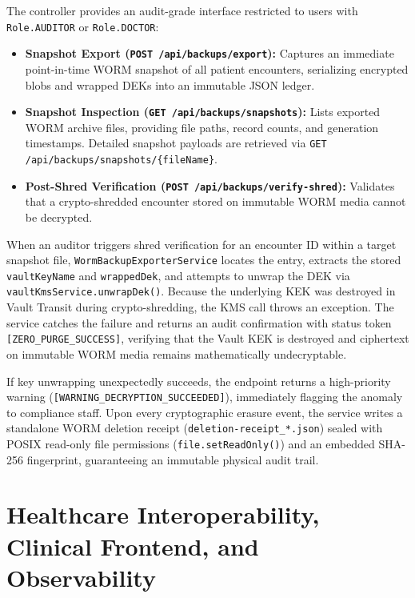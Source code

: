 The controller provides an audit-grade interface restricted to users with \texttt{Role.AUDITOR} or \texttt{Role.DOCTOR}:
\begin{itemize}
    \item \textbf{Snapshot Export (\texttt{POST /api/backups/export}):} Captures an immediate point-in-time WORM snapshot of all patient encounters, serializing encrypted blobs and wrapped DEKs into an immutable JSON ledger.
    \item \textbf{Snapshot Inspection (\texttt{GET /api/backups/snapshots}):} Lists exported WORM archive files, providing file paths, record counts, and generation timestamps. Detailed snapshot payloads are retrieved via \texttt{GET /api/backups/snapshots/\{fileName\}}.
    \item \textbf{Post-Shred Verification (\texttt{POST /api/backups/verify-shred}):} Validates that a crypto-shredded encounter stored on immutable WORM media cannot be decrypted.
\end{itemize}

When an auditor triggers shred verification for an encounter ID within a target snapshot file, \texttt{WormBackupExporterService} locates the entry, extracts the stored \texttt{vaultKeyName} and \texttt{wrappedDek}, and attempts to unwrap the DEK via \texttt{vaultKmsService.unwrapDek()}. Because the underlying KEK was destroyed in Vault Transit during crypto-shredding, the KMS call throws an exception. The service catches the failure and returns an audit confirmation with status token \texttt{[ZERO\_PURGE\_SUCCESS]}, verifying that the Vault KEK is destroyed and ciphertext on immutable WORM media remains mathematically undecryptable.

If key unwrapping unexpectedly succeeds, the endpoint returns a high-priority warning (\texttt{[WARNING\_DECRYPTION\_SUCCEEDED]}), immediately flagging the anomaly to compliance staff. Upon every cryptographic erasure event, the service writes a standalone WORM deletion receipt (\texttt{deletion-receipt\_*.json}) sealed with POSIX read-only file permissions (\texttt{file.setReadOnly()}) and an embedded SHA-256 fingerprint, guaranteeing an immutable physical audit trail.


\section{Healthcare Interoperability, Clinical Frontend, and Observability}\label{section:impl-frontend}

